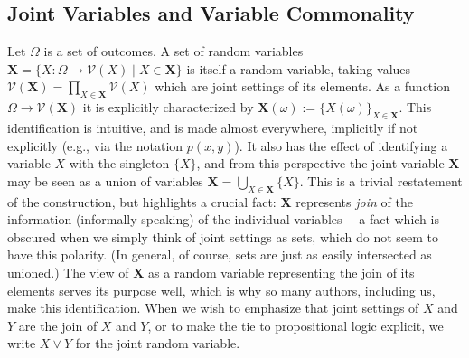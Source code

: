 \documentclass{article}
\theoremstyle{plain}
\theoremstyle{definition}
\theoremstyle{remark}
\newcommand{\mat}[1]{\mathbf{#1}}
\newcommand{\V}{\mathcal V}
\begin{document}
	\subsection{Joint Variables and Variable Commonality }
	Let $\Omega$ is a set of outcomes. A set of random variables $\mat X = \{ X : \Omega \to \V(X)  \mid X \in \mat X \}$ is itself a random variable, taking values $\V(\mat X) = \prod_{X \in \mat X} \V(X) $ which are joint settings of its elements. As a function $\Omega \to \V(\mat X)$ it is explicitly characterized by $\mat X(\omega) := \{ X(\omega) \}_{X \in \mat X}$.	
	This identification is intuitive, and is made almost everywhere, implicitly if not explicitly (e.g., via the notation $p(x,y)$). It also has the effect of identifying a variable $X$ with the singleton $\{X\}$, and from this perspective the joint variable $\mat X$ may be seen as a union of variables $\mat X = \bigcup_{X \in \mat X} \{ X \}$. 
	This is a trivial restatement of the construction, but highlights a crucial fact: $\mat X$ represents \emph{join} of the information (informally speaking) of the individual variables--- a fact which is obscured when we simply think of joint settings as sets, which do not seem to have this polarity. (In general, of course, sets are just as easily intersected as unioned.) The view of $\mat X$ as a random variable representing the join of its elements serves its purpose well, which is why so many authors, including us, make this identification. When we wish to emphasize that joint settings of $X$ and $Y$ are the join of $X$ and $Y$, or to make the tie to propositional logic explicit, we write $X \lor Y$ for the joint random variable. 
	
\end{document}
